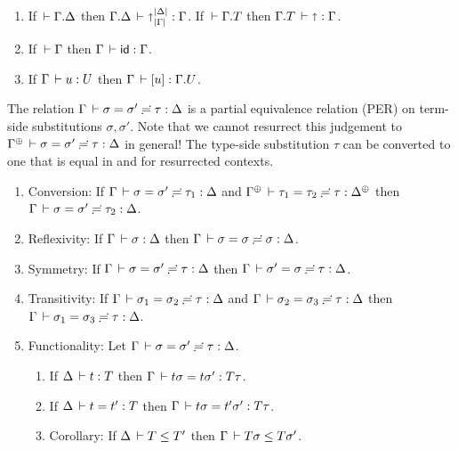 \documentclass[acmlarge,review,anonymous]{acmart}\settopmatter{printfolios=true}
\begin{document}
\begin{lemma}
\label{lem:specsub}\bla
\begin{enumerate}
\item If\/ $\,\vdash \Gamma. \Delta$ then $\Gamma. \Delta \,\vdash \mathord{\shortuparrow}_{|\Gamma|}^{|\Delta|} : \Gamma$.
      If\/ $\,\vdash \Gamma. T$ then $\Gamma. T \,\vdash \mathord{\shortuparrow} : \Gamma$.
\item If\/ $\,\vdash \Gamma$ then $\Gamma \,\vdash \mathsf{id} : \Gamma$.
\item If\/ $\Gamma \,\vdash u : U$ then $\Gamma \,\vdash [u] : \Gamma. U$.
\end{enumerate}
\end{lemma}

The relation $\Gamma \,\vdash \sigma = \sigma' \risingdotseq \tau : \Delta$ is a partial equivalence
relation (PER) on term-side substitutions $\sigma,\sigma'$. Note that
we cannot resurrect this judgement to
$\sueq{\resurrect\Gamma}{\sigma}{\sigma'}\tau \Delta$ in general!
The type-side substitution $\tau$ can be converted to one that is
equal in and for resurrected contexts.
\begin{lemma}
\label{lem:subeq}\bla
\begin{enumerate}
\item Conversion: If\/ $\Gamma \,\vdash \sigma = \sigma' \risingdotseq \tau_1 : \Delta$ and $\sueq {\resurrect\Gamma} {\tau_1} {\tau_2} {\tau} {\resurrect\Delta}$ then $\Gamma \,\vdash \sigma = \sigma' \risingdotseq \tau_2 : \Delta$.
\item Reflexivity: If\/ $\Gamma \,\vdash \sigma : \Delta$ then $\Gamma \,\vdash \sigma = \sigma \risingdotseq \sigma : \Delta$.
\item Symmetry:  If\/ $\Gamma \,\vdash \sigma = \sigma' \risingdotseq \tau : \Delta$ then $\Gamma \,\vdash \sigma' = \sigma \risingdotseq \tau : \Delta$.
\item Transitivity:  If\/ $\Gamma \,\vdash \sigma_1 = \sigma_2 \risingdotseq \tau : \Delta$ and $\Gamma \,\vdash \sigma_2 = \sigma_3 \risingdotseq \tau : \Delta$ then $\Gamma \,\vdash \sigma_1 = \sigma_3 \risingdotseq \tau : \Delta$.
\item Functionality: Let $\Gamma \,\vdash \sigma = \sigma' \risingdotseq \tau : \Delta$.
  \begin{enumerate}
  \item
  If\/ $\Delta \,\vdash t : T$ then $\Gamma \,\vdash t\sigma = t\sigma' : T\tau$.
  \item
  If\/ $\Delta \,\vdash t = t' : T$ then $\Gamma \,\vdash t\sigma = t'\sigma' : T\tau$.
  \item
  Corollary: If\/ $\Delta \,\vdash T \leq T'$ then $\Gamma \,\vdash T\sigma \leq T\sigma'$.
  \end{enumerate}
\end{enumerate}
\end{lemma}
\end{document}
